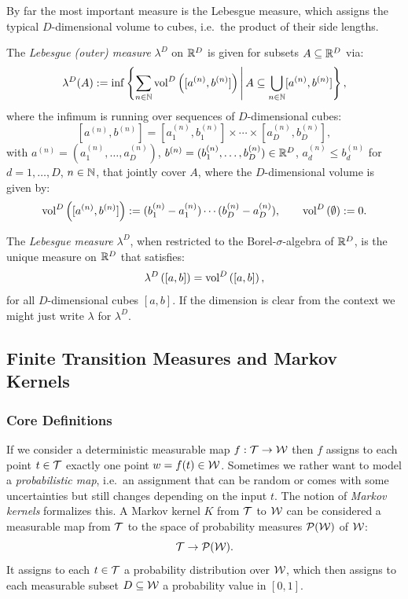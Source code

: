 By far the most important measure is the Lebesgue measure, which assigns the typical $D$-dimensional volume to cubes, i.e.\
the product of their side lengths.

\begin{Def}
    The \emph{Lebesgue (outer) measure} $\lambda^D$ on $\mathbb{R}^D$ is given for subsets $A \subseteq \mathbb{R}^D$ via:
    \[ \lambda^D(A) := \inf\left \{ \sum_{n \in \mathbb{N}} \mathrm{vol}^D\left ( [a^{(n)},b^{(n)}] \right )  \,\middle|\,  
    A \subseteq \bigcup_{n \in \mathbb{N}} [a^{(n)},b^{(n)}]  \right \}, \]
    where the infimum is running over sequences of $D$-dimensional cubes:
     \[ [a^{(n)},b^{(n)}] = [a_1^{(n)},b_1^{(n)}] \times \cdots \times [a_D^{(n)}, b_D^{(n)}],\]
  with $a^{(n)}=(a_1^{(n)},\dots,a_D^{(n)})$, $b^{(n)}=(b_1^{(n)},\dots,b_D^{(n)}) \in \mathbb{R}^D$, $a_d^{(n)} \le b_d^{(n)}$ for $d=1,\dots,D$, $n \in \mathbb{N}$, that jointly cover $A$, where the $D$-dimensional volume is given by:
  \[ \mathrm{vol}^D\left ( [a^{(n)},b^{(n)}] \right ) := (b_1^{(n)}-a_1^{(n)}) \cdots (b_D^{(n)}-a_D^{(n)}),\qquad \mathrm{vol}^D\left ( \emptyset \right ) :=0. \]
\end{Def}

\begin{Thm}
 The \emph{Lebesgue measure} $\lambda^D$, when restricted to the Borel-$\sigma$-algebra of $\mathbb{R}^D$,
  is the unique measure on $\mathbb{R}^D$ that satisfies:
    \[ \lambda^D\left ( [a,b] \right ) = \mathrm{vol}^D\left ( [a,b] \right ),     \]
    for all $D$-dimensional cubes $[a,b]$.
    If the dimension is clear from the context we might just write $\lambda$ for $\lambda^D$.
\end{Thm}


\subsection{Finite Transition Measures and Markov Kernels}

\subsubsection{Core Definitions}

\begin{Motivation}
 If we consider a deterministic measurable map $f: \mathcal{T} \to \mathcal{W}$ then $f$ assigns to each point $t \in \mathcal{T}$ exactly one point $w=f(t) \in \mathcal{W}$.
 Sometimes we rather want to model a \emph{probabilistic map}, i.e.\ an assignment that can be random or comes with some uncertainties but still changes depending on the input $t$. 
 The notion of \emph{Markov kernels} formalizes this. 
A Markov kernel $K$ from $\mathcal{T}$ to $\mathcal{W}$
can be considered  a measurable map from $\mathcal{T}$ to the space of probability measures $\mathcal{P}(\mathcal{W})$ of $\mathcal{W}$:
    \[ \mathcal{T} \to \mathcal{P}(\mathcal{W}).\]
 It assigns to each $t \in \mathcal{T}$ a probability distribution over $\mathcal{W}$, which then assigns to 
    each measurable subset $D \subseteq \mathcal{W}$ a probability value in $[0,1]$.
\end{Motivation}

